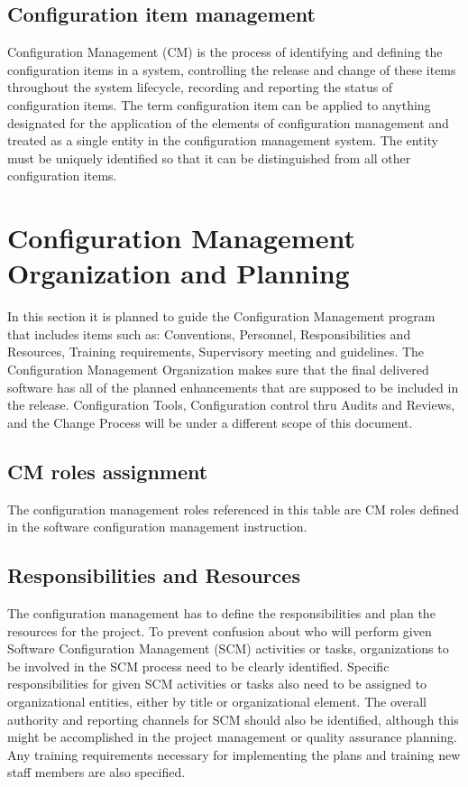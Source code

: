 \documentclass{template/openetcs_article}
\begin{document}
\subsection{Configuration item management}
Configuration Management (CM) is the process of identifying and defining the configuration items in a system, controlling the  release and change of these items throughout the system lifecycle, recording and reporting the status of configuration items.  The term configuration item can be applied to anything designated for the application of the elements of configuration  management and treated as a single entity in the configuration management system. The entity must be uniquely identified so  that it can be distinguished from all other configuration items.


\section{Configuration Management Organization and Planning}
In this section it is planned to guide the Configuration Management program that includes items such as: Conventions,  Personnel, Responsibilities and Resources, Training requirements, Supervisory meeting and guidelines. The Configuration  Management Organization makes sure that the final delivered software has all of the planned enhancements that are  supposed to be included in the release.
Configuration Tools, Configuration control thru Audits and Reviews, and the Change Process will be under a different scope of  this document.

\subsection{CM roles assignment}
The configuration management roles referenced in this table are CM roles defined in the software configuration management  instruction.

\subsection{Responsibilities and Resources}
The configuration management has to define the responsibilities and plan the resources for the project. To prevent confusion  about who will perform given Software Configuration Management (SCM) activities or tasks, organizations to be involved in  the SCM process need to be clearly identified. Specific responsibilities for given SCM activities or tasks also need to be  assigned to organizational entities, either by title or organizational element. The overall authority and reporting channels for  SCM should also be identified, although this might be accomplished in the project management or quality assurance planning.  Any training requirements necessary for implementing the plans and training new staff members are also specified.
\end{document}
